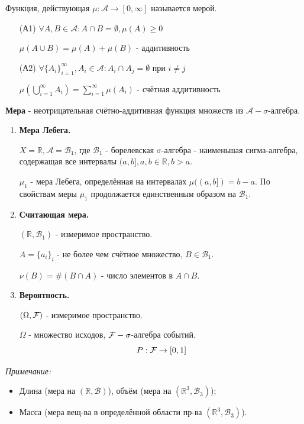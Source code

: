 \begin{definition}[Мера]
	Функция, действующая $\mu: \mathcal{A} \to [0, \infty]$ называется мерой.
	\begin{enumerate}
		\item[(А1)] $\forall A, B \in \mathcal{A}: A \cap B = \emptyset, \mu (A) \ge 0$
		
		$\mu (A \cup B) = \mu(A) + \mu(B)$ - аддитивность
		\item[(А2)] $\forall \{ A_i \}_{i=1}^{\infty}, A_i \in \mathcal{A} : A_i \cap A_j = \emptyset$ при $i \ne j$
		
		$\mu \left( \bigcup\limits_{i=1}^{\infty} A_i \right) = \sum\limits_{i=1}^{\infty} \mu (A_i)$ - счётная аддитивность
	\end{enumerate}
	\textbf{Мера} - неотрицательная счётно-аддитивная функция множеств из $\mathcal{A} - \sigma$-алгебра.
\end{definition}

\begin{exmp}\leavevmode \vspace*{-\bigskipamount}\vspace*{-\medskipamount}
	\begin{enumerate}
		\item \textbf{Мера Лебега.}
		
		$X = \mathbb{R}, \mathcal{A} = \mathcal{B}_1$, где $\mathcal{B}_1$ - борелевская $\sigma$-алгебра - наименьшая сигма-алгебра, содержащая все интервалы $(a, b], a, b \in \mathbb{R}, b > a$.
		
		$\mu_1$ - мера Лебега, определённая на интервалах $\mu ((a, b]) = b - a$. По свойствам меры $\mu_1$ продолжается единственным образом на $\mathcal{B}_1$.
		
		\item \textbf{Считающая мера.}
		
		$(\mathbb{R}, \mathcal{B}_1)$ - измеримое пространство.
		
		$A = \{ a_i \}_i$ - не более чем счётное множество, $B \in \mathcal{B}_1$.
		
		$\nu (B) = \# (B \cap A)$ - число элементов в $A \cap B$.
		
		\item \textbf{Вероятность.}
		
		$(\Omega, {\mathcal F})$ - измеримое пространство.
		
		$\Omega$ - множество исходов, ${\mathcal F} - \sigma$-алгебра событий.
		\[ P : {\mathcal F} \to [0, 1] \]
	\end{enumerate}
\end{exmp}
\textit{Примечание:}
\begin{itemize}
	\item Длина (мера на $(\mathbb{R}, \mathcal{B})$), объём (мера на $(\mathbb{R}^3, \mathcal{B}_3)$);
	
	\item Масса (мера вещ-ва в определённой области пр-ва $(\mathbb{R}^3, \mathcal{B}_3)$).
\end{itemize}

